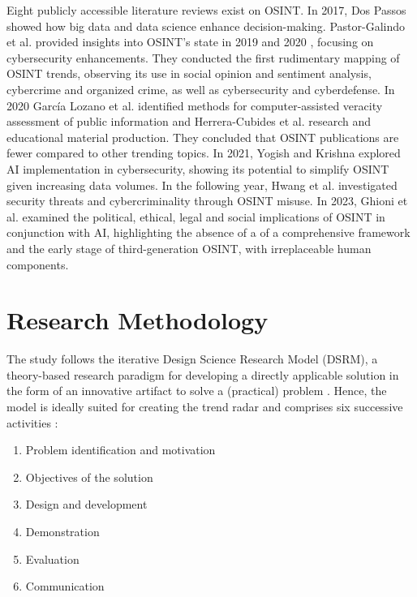 \documentclass[10pt]{article}
\begin{document}
Eight publicly accessible literature reviews exist on OSINT. In 2017, Dos Passos \cite{DosPassos.2017} showed how big data and data science enhance decision-making. Pastor-Galindo et al.
provided insights into OSINT's state in 2019 and 2020 \cite{PastorGalindo.2019, PastorGalindo.2020}, focusing on cybersecurity
enhancements. They conducted the first rudimentary mapping of OSINT trends, observing its use in social opinion and sentiment
analysis, cybercrime and organized crime, as well as cybersecurity and cyberdefense. In 2020 García Lozano et al. \cite{GarciaLozano.2020}
identified methods for computer-assisted veracity assessment of public information and
Herrera-Cubides et al. \cite{HerreraCubides.2020} research and educational material production. They concluded that OSINT
publications are fewer compared to other trending topics. In 2021, Yogish and Krishna \cite{Yogish.2021} explored AI implementation in cybersecurity,
showing its potential to simplify OSINT given increasing data volumes. In the following year, Hwang et al.
\cite{Hwang.2022} investigated security threats and cybercriminality through OSINT misuse.
In 2023, Ghioni et al. \cite{Ghioni.2023} examined the political, ethical, legal and social implications of
OSINT in conjunction with AI, highlighting the absence of a of a comprehensive framework and the early stage of third-generation OSINT, with irreplaceable human components.

\section{Research Methodology}

The study follows the iterative Design Science Research Model (DSRM),
a theory-based research paradigm for developing a directly applicable solution in the form of an innovative artifact \cite{vomBrocke.2020b}
to solve a (practical) problem \cite{Peffers.2007}. Hence, the model is ideally suited for creating the trend radar and comprises
six successive activities \cite{Peffers.2007}:

\begin{enumerate}
    \item Problem identification and motivation
    \item Objectives of the solution
    \item Design and development
    \item Demonstration
    \item Evaluation
    \item Communication
\end{enumerate}
\end{document}
